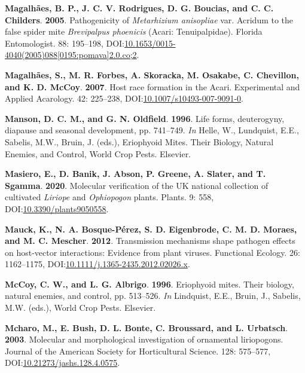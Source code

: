 \documentclass[12pt,final,CPage]{ufthesis}
\newlength{\cslhangindent}
\newenvironment{CSLReferences}[2] %
{%
	\setlength{\parindent}{0pt}
	\ifodd #1 \everypar{\setlength{\hangindent}{\cslhangindent}}\ignorespaces\fi
	\ifnum #2 > 0
	\setlength{\parskip}{#2\baselineskip}
	\fi
}%
{}
\begin{document}
{\begin{CSLReferences}{1}{0}
  \leavevmode{}%
  \textbf{Magalhães, B. P., J. C. V. Rodrigues, D. G. Boucias, and C. C. Childers}. \textbf{2005}. Pathogenicity of {\emph{Metarhizium anisopliae}} var. Acridum to the false spider mite {\emph{Brevipalpus phoenicis}} ({Acari}: {Tenuipalpidae}). Florida Entomologist. 88: 195--198, DOI:\href{https://doi.org/10.1653/0015-4040(2005)088\%5B0195:pomava\%5D2.0.co;2}{10.1653/0015-4040(2005)088{[}0195:pomava{]}2.0.co;2}.

  \leavevmode{}%
  \textbf{Magalhães, S., M. R. Forbes, A. Skoracka, M. Osakabe, C. Chevillon, and K. D. McCoy}. \textbf{2007}. Host race formation in the {Acari}. Experimental and Applied Acarology. 42: 225--238, DOI:\href{https://doi.org/10.1007/s10493-007-9091-0}{10.1007/s10493-007-9091-0}.

  \leavevmode{}%
  \textbf{Manson, D. C. M., and G. N. Oldfield}. \textbf{1996}. Life forms, deuterogyny, diapause and seasonal development, pp. 741--749. \emph{In} Helle, W., Lundquist, E.E., Sabelis, M.W., Bruin, J. (eds.), Eriophyoid Mites. Their Biology, Natural Enemies, and Control, World Crop Pests. Elsevier.

  \leavevmode{}%
  \textbf{Masiero, E., D. Banik, J. Abson, P. Greene, A. Slater, and T. Sgamma}. \textbf{2020}. Molecular verification of the {UK} national collection of cultivated {\emph{Liriope}} and {\emph{Ophiopogon}} plants. Plants. 9: 558, DOI:\href{https://doi.org/10.3390/plants9050558}{10.3390/plants9050558}.

  \leavevmode{}%
  \textbf{Mauck, K., N. A. Bosque-Pérez, S. D. Eigenbrode, C. M. D. Moraes, and M. C. Mescher}. \textbf{2012}. Transmission mechanisms shape pathogen effects on host-vector interactions: Evidence from plant viruses. Functional Ecology. 26: 1162--1175, DOI:\href{https://doi.org/10.1111/j.1365-2435.2012.02026.x}{10.1111/j.1365-2435.2012.02026.x}.

  \leavevmode{}%
  \textbf{McCoy, C. W., and L. G. Albrigo}. \textbf{1996}. Eriophyoid mites. Their biology, natural enemies, and control, pp. 513--526. \emph{In} Lindquist, E.E., Bruin, J., Sabelis, M.W. (eds.), World Crop Pests. Elsevier.

  \leavevmode{}%
  \textbf{Mcharo, M., E. Bush, D. L. Bonte, C. Broussard, and L. Urbatsch}. \textbf{2003}. Molecular and morphological investigation of ornamental liriopogons. Journal of the American Society for Horticultural Science. 128: 575--577, DOI:\href{https://doi.org/10.21273/jashs.128.4.0575}{10.21273/jashs.128.4.0575}.


\end{CSLReferences}}
\end{document}
